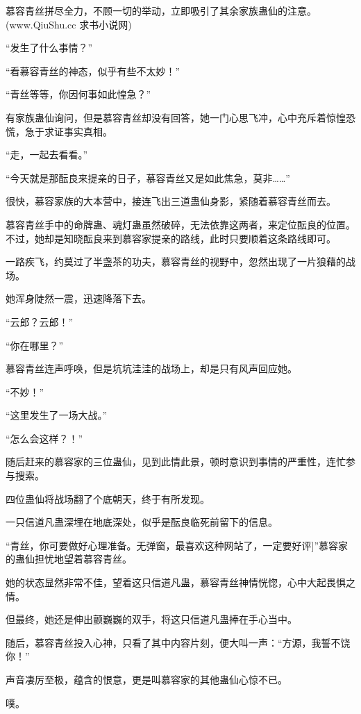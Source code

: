 
\begin{this_body}

慕容青丝拼尽全力，不顾一切的举动，立即吸引了其余家族蛊仙的注意。(www.QiuShu.cc 求书小说网)

“发生了什么事情？”

“看慕容青丝的神态，似乎有些不太妙！”

“青丝等等，你因何事如此惶急？”

有家族蛊仙询问，但是慕容青丝却没有回答，她一门心思飞冲，心中充斥着惊惶恐慌，急于求证事实真相。

“走，一起去看看。”

“今天就是那酝良来提亲的日子，慕容青丝又是如此焦急，莫非……”

很快，慕容家族的大本营中，接连飞出三道蛊仙身影，紧随着慕容青丝而去。

慕容青丝手中的命牌蛊、魂灯蛊虽然破碎，无法依靠这两者，来定位酝良的位置。不过，她却是知晓酝良来到慕容家提亲的路线，此时只要顺着这条路线即可。

一路疾飞，约莫过了半盏茶的功夫，慕容青丝的视野中，忽然出现了一片狼藉的战场。

她浑身陡然一震，迅速降落下去。

“云郎？云郎！”

“你在哪里？”

慕容青丝连声呼唤，但是坑坑洼洼的战场上，却是只有风声回应她。

“不妙！”

“这里发生了一场大战。”

“怎么会这样？！”

随后赶来的慕容家的三位蛊仙，见到此情此景，顿时意识到事情的严重性，连忙参与搜索。

四位蛊仙将战场翻了个底朝天，终于有所发现。

一只信道凡蛊深埋在地底深处，似乎是酝良临死前留下的信息。

“青丝，你可要做好心理准备。无弹窗，最喜欢这种网站了，一定要好评]”慕容家的蛊仙担忧地望着慕容青丝。

她的状态显然非常不佳，望着这只信道凡蛊，慕容青丝神情恍惚，心中大起畏惧之情。

但最终，她还是伸出颤巍巍的双手，将这只信道凡蛊捧在手心当中。

随后，慕容青丝投入心神，只看了其中内容片刻，便大叫一声：“方源，我誓不饶你！”

声音凄厉至极，蕴含的恨意，更是叫慕容家的其他蛊仙心惊不已。

噗。


\end{this_body}
